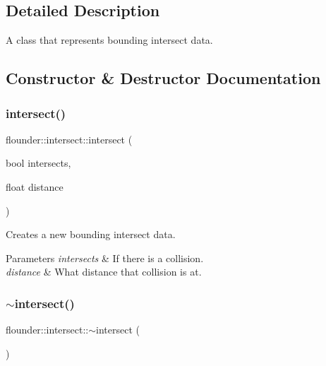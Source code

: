 \subsection{Detailed Description}
A class that represents bounding intersect data. 



\subsection{Constructor \& Destructor Documentation}
\mbox{\label{classflounder_1_1intersect_a2c5914ddf56d123d8850fbfdba24d414}} 
\subsubsection{\texorpdfstring{intersect()}{intersect()}}
{\footnotesize\ttfamily flounder\+::intersect\+::intersect (\begin{DoxyParamCaption}\item[{bool}]{intersects,  }\item[{float}]{distance }\end{DoxyParamCaption})\hspace{0.3cm}{\ttfamily [inline]}}



Creates a new bounding intersect data. 


\begin{DoxyParams}{Parameters}
{\em intersects} & If there is a collision. \\
\hline
{\em distance} & What distance that collision is at. \\
\hline
\end{DoxyParams}
\mbox{\label{classflounder_1_1intersect_a9e7a429dfedbb9977ee512a3804eea94}} 
\subsubsection{\texorpdfstring{$\sim$intersect()}{~intersect()}}
{\footnotesize\ttfamily flounder\+::intersect\+::$\sim$intersect (\begin{DoxyParamCaption}{ }\end{DoxyParamCaption})\hspace{0.3cm}{\ttfamily [inline]}}



